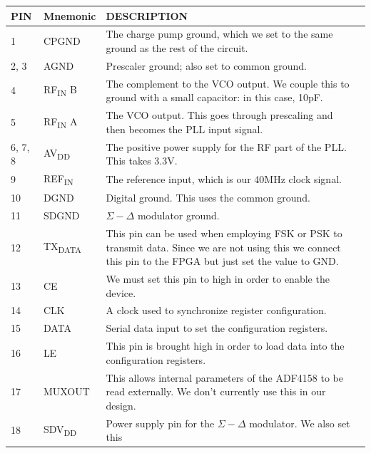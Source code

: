 \label{tab:adf4158-pins}
\begin{tabularx}{\textwidth}{l l X>{\raggedright\arraybackslash}X}
        \caption{All ADF4158 pin connections.} \\
        \toprule
        \textbf{PIN} & \textbf{Mnemonic} & \textbf{DESCRIPTION} \\
        \midrule

        \endhead{}

        1 & CPGND & The charge pump ground, which we set to the same ground as the rest of the circuit. \\
        2, 3 & AGND & Prescaler ground; also set to common ground. \\
        4 & RF\textsubscript{IN} B & The complement to the VCO output. We couple this to ground with a
        small capacitor: in this case, 10pF. \\
        5 & RF\textsubscript{IN} A & The VCO output. This goes through prescaling and then becomes the PLL
        input signal. \\
        6, 7, 8 & AV\textsubscript{DD} & The positive power supply for the RF part of the PLL. This takes
        3.3V. \\
        9 & REF\textsubscript{IN} & The reference input, which is our 40MHz clock signal. \\
        10 & DGND & Digital ground. This uses the common ground. \\
        11 & SDGND & $\Sigma-\Delta$ modulator ground. \\
        12 & TX\textsubscript{DATA} & This pin can be used when employing FSK or PSK to transmit
        data. Since we are not using this we connect this pin to the FPGA
        but just set the value to GND. \\
        13 & CE & We must set this pin to high in order to enable the device. \\
        14 & CLK & A clock used to synchronize register configuration. \\
        15 & DATA & Serial data input to set the configuration registers. \\
        16 & LE & This pin is brought high in order to load data into the configuration registers. \\
        17 & MUXOUT & This allows internal parameters of the ADF4158 to be read externally. We don't
        currently use this in our design. \\
        18 & SDV\textsubscript{DD} & Power supply pin for the $\Sigma-\Delta$ modulator. We also set this

\end{tabularx}
